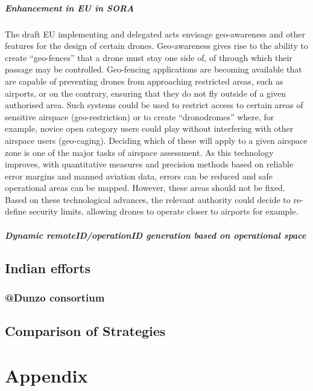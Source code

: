 \documentclass{ua_wgs_base}
\begin{document}
\paragraph{Enhancement in EU in SORA}

The draft EU implementing and delegated acts envisage geo-awareness
and other features for the design of certain drones. Geo-awareness
gives rise to the ability to create \textquotedblleft geo-fences\textquotedblright{}
that a drone must stay one side of, of through which their passage
may be controlled. Geo-fencing applications are becoming available
that are capable of preventing drones from approaching restricted
areas, such as airports, or on the contrary, ensuring that they do
not fly outside of a given authorised area. Such systems could be
used to restrict access to certain areas of sensitive airspace (geo-restriction)
or to create \textquotedblleft dronodromes\textquotedblright{} where,
for example, novice open category users could play without interfering
with other airspace users (geo-caging). Deciding which of these will
apply to a given airspace zone is one of the major tasks of airspace
assessment. As this technology improves, with quantitative measures
and precision methods based on reliable error margins and manned aviation
data, errors can be reduced and safe operational areas can be mapped.
However, these areas should not be fixed. Based on these technological
advances, the relevant authority could decide to re-define security
limits, allowing drones to operate closer to airports for example.

\paragraph{Dynamic remoteID/operationID generation based on operational space}

\section{Indian efforts}

\subsection{@Dunzo consortium}

\section{Comparison of Strategies}

\chapter{Appendix}
\end{document}
